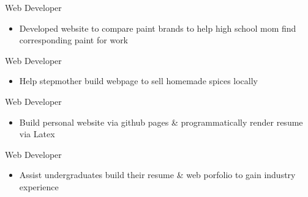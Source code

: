 
\subtitle{Find a Paint}{Web Developer}{}

\begin{itemize}
    \item Developed website to compare paint brands to help high school mom find corresponding paint for work
\end{itemize}


\subtitle{Masala Blend}{Web Developer}{}

\begin{itemize}
    \item Help stepmother build webpage to sell homemade spices locally
     
\end{itemize}


\subtitle{Personal Website \& Resume}{Web Developer}{}

\begin{itemize}
    \item Build personal website via github pages \& programmatically render resume via Latex
\end{itemize}


\subtitle{Peer Portfolio Consulting}{Web Developer}{}

\begin{itemize}
    \item Assist undergraduates build their resume \& web porfolio to gain industry experience
\end{itemize}
